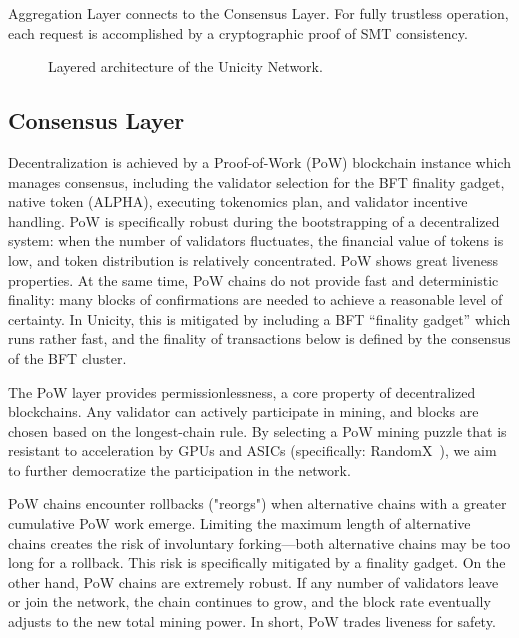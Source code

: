 \documentclass[twocolumn]{article}
\begin{document}
Aggregation Layer connects to the Consensus Layer. For fully trustless operation, each request is accomplished by a cryptographic proof of SMT consistency.

\begin{figure}[!htbp]
    \centering
    \caption{Layered architecture of the Unicity Network.}\label{fig:layers}
\end{figure}


\subsection{Consensus Layer}
Decentralization is achieved by a Proof-of-Work (PoW) blockchain instance which manages consensus, including the validator selection for the BFT finality gadget, native token (ALPHA), executing tokenomics plan, and validator incentive handling. PoW is specifically robust during the bootstrapping of a decentralized system: when the number of validators fluctuates, the financial value of tokens is low, and token distribution is relatively concentrated. PoW shows great liveness properties. At the same time, PoW chains do not provide fast and deterministic finality: many blocks of confirmations are needed to achieve a reasonable level of certainty. In Unicity, this is mitigated by including a BFT ``finality gadget'' which runs rather fast, and the finality of transactions below is defined by the consensus of the BFT cluster.

The PoW layer provides permissionlessness, a core property of decentralized blockchains. Any validator can actively participate in mining, and blocks are chosen based on the longest-chain rule. By selecting a PoW mining puzzle that is resistant to acceleration by GPUs and ASICs (specifically: RandomX~\cite{randomx}), we aim to further democratize the participation in the network.

PoW chains encounter rollbacks ("reorgs") when alternative chains with a greater cumulative PoW work emerge. Limiting the maximum length of alternative chains creates the risk of involuntary forking---both alternative chains may be too long for a rollback. This risk is specifically mitigated by a finality gadget. On the other hand, PoW chains are extremely robust. If any number of validators leave or join the network, the chain continues to grow, and the block rate eventually adjusts to the new total mining power. In short, PoW trades liveness for safety.
\end{document}

